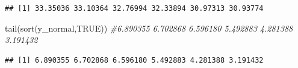 \documentclass[
]{book}
\newenvironment{Shaded}{\begin{snugshade}}{\end{snugshade}}
\newcommand{\CommentTok}[1]{\textcolor[rgb]{0.56,0.35,0.01}{\textit{#1}}}
\newcommand{\ConstantTok}[1]{\textcolor[rgb]{0.00,0.00,0.00}{#1}}
\newcommand{\FunctionTok}[1]{\textcolor[rgb]{0.00,0.00,0.00}{#1}}
\newcommand{\NormalTok}[1]{#1}
\begin{document}
\begin{verbatim}
## [1] 33.35036 33.10364 32.76994 32.33894 30.97313 30.93774
\end{verbatim}

\begin{Shaded}
\begin{Highlighting}[]
\FunctionTok{tail}\NormalTok{(}\FunctionTok{sort}\NormalTok{(y\_normal,}\ConstantTok{TRUE}\NormalTok{)) }\CommentTok{\#6.890355 6.702868 6.596180 5.492883 4.281388 3.191432}
\end{Highlighting}
\end{Shaded}

\begin{verbatim}
## [1] 6.890355 6.702868 6.596180 5.492883 4.281388 3.191432
\end{verbatim}
\end{document}
